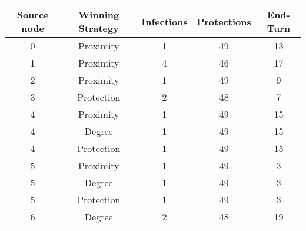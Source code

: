 \documentclass[results.tex]{subfiles}
\begin{document}
    \begin{center}
        \begin{tabular}{| c || c | c | c | c |}
            \hline
            {\bfseries Source node} & {\bfseries Winning Strategy} & {\bfseries Infections} & {\bfseries Protections}
            & {\bfseries End-Turn}
            \\  %
            \hline\hline
            0                       & Proximity                    & 1                      & 49                      & 13                   \\
            \hline
            1                       & Proximity                    & 4                      & 46                      & 17                   \\
            \hline
            2                       & Proximity                    & 1                      & 49                      & 9                    \\
            \hline
            3                       & Protection                   & 2                      & 48                      & 7                    \\
            \hline
            4                       & Proximity                    & 1                      & 49                      & 15                   \\
            \hline
            4                       & Degree                       & 1                      & 49                      & 15                   \\
            \hline
            4                       & Protection                   & 1                      & 49                      & 15                   \\
            \hline
            5                       & Proximity                    & 1                      & 49                      & 3                    \\
            \hline
            5                       & Degree                       & 1                      & 49                      & 3                    \\
            \hline
            5                       & Protection                   & 1                      & 49                      & 3                    \\
            \hline
            6                       & Degree                       & 2                      & 48                      & 19                   \\

\end{tabular}
\end{center}
\end{document}
